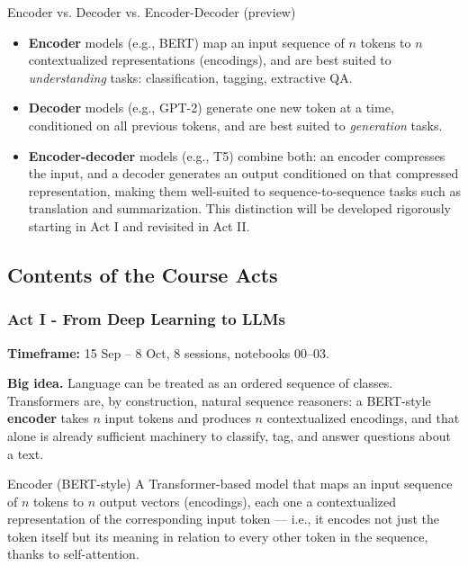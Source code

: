 \begin{defbox}{Encoder vs. Decoder vs. Encoder-Decoder (preview)}
    \begin{itemize}
\item\textbf{Encoder} models (e.g., BERT) map an input sequence of $n$ tokens to $n$ contextualized representations (encodings), and are best suited to \emph{understanding} tasks: classification, tagging, extractive QA. 
\item \textbf{Decoder} models (e.g., GPT-2) generate one new token at a time, conditioned on all previous tokens, and are best suited to \emph{generation} tasks. 
\item\textbf{Encoder-decoder} models (e.g., T5) combine both: an encoder compresses the input, and a decoder generates an output conditioned on that compressed representation, making them well-suited to sequence-to-sequence tasks such as translation and summarization. This distinction will be developed rigorously starting in Act I  and revisited in Act II. \end{itemize}
\end{defbox}

\subsection{Contents of the Course Acts}

\subsubsection{Act I - From Deep Learning to LLMs}

\textbf{Timeframe:} 15 Sep -- 8 Oct, 8 sessions, notebooks 00--03.

\textbf{Big idea.} Language can be treated as an ordered sequence of classes. Transformers are, by construction, natural sequence reasoners: a BERT-style \textbf{encoder} takes $n$ input tokens and produces $n$ contextualized encodings, and that alone is already sufficient machinery to classify, tag, and answer questions about a text.

\begin{defbox}{Encoder (BERT-style)}
A Transformer-based model that maps an input sequence of $n$ tokens to $n$ output vectors (encodings), each one a contextualized representation of the corresponding input token — i.e., it encodes not just the token itself but its meaning in relation to every other token in the sequence, thanks to self-attention.
\end{defbox}

